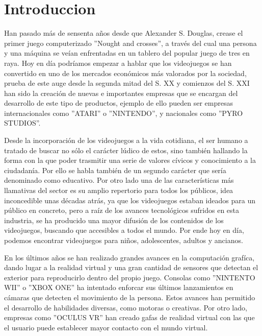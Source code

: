 %
%

\chapter[Introduccion]{
	Introduccion
}

Han pasado más de sensenta años desde que Alexander S. Douglas, crease el primer juego computerizado ''Nought and crosses'', a través del cual una persona y una máquina se veían enfrentadas en un tablero del popular juego de tres en raya. Hoy en día podríamos empezar a hablar que los videojuegos se han convertido en uno de los mercados económicos más valorados por la sociedad, prueba de este auge desde la segunda mitad del S. XX y comienzos del S. XXI han sido la creación de nuevas e importantes empresas que se encargan del desarrollo de este tipo de productos, ejemplo de ello pueden ser empresas  internacionales como ''ATARI'' o ''NINTENDO'', y nacionales como ''PYRO STUDIOS''.

Desde la incorporación de los videojuegos a la vida cotidiana, el ser humano a tratado de buscar no sólo el carácter lúdico de estos, sino también hallando la forma con la que poder trasmitir una serie de valores cívicos y conocimiento a la ciudadanía. Por ello se habla también de un segundo carácter que sería denominado como educativo. Por otro lado una de las características más llamativas del sector es su amplio repertorio para todos los públicos, idea inconcedible unas décadas atrás, ya que los videojuegos estaban ideados para un público en concreto, pero a raíz de los avances tecnológicos sufridos en esta industria, se ha producido una mayor difusión de los contenidos de los videojuegos, buscando que accesibles a todos el mundo. Por ende hoy en día, podemos encontrar videojuegos para niños, adolescentes, adultos y ancianos\cite{B12}.

En los últimos años se han realizado grandes avances en la computación grafíca, dando lugar a la realidad virtual y una gran cantidad de sensores que detectan el exterior para reproducirlo dentro del propio juego. Consolas como ''NINTENTO WII'' o ''XBOX ONE'' ha intentado enforcar sus últimos lanzamientos en cámaras que detecten el movimiento de la persona. Estos avances han permitido el desarrollo de habilidades diversas, como motoras o creativas. Por otro lado, empresas como ''OCULUS VR'' han creado gafas de realidad virtual con las que el usuario puede establecer mayor contacto con el mundo virtual.

